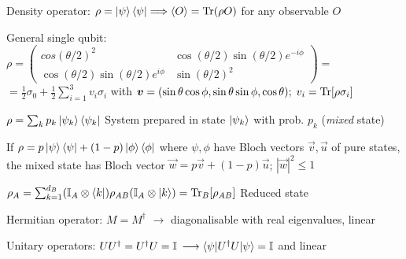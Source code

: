 \begin{squishlist}
    \item Density operator: $\rho = \ket{\psi} \bra{\psi} \Longrightarrow \braket{O} = \mathrm{Tr} (\rho O)$ for any observable $O$
\item General single qubit: $\rho = \begin{pmatrix} cos(\theta/2)^2 & \cos(\theta/2)\sin(\theta/2)e^{-i\phi} \\ \cos(\theta/2)\sin(\theta/2)e^{i\phi} & \sin(\theta/2)^2 \end{pmatrix} = $ \\
$= \frac{1}{2}\sigma_0 + \frac{1}{2}\sum_{i=1}^3 v_i \sigma_i$ with $\mbox{\boldmath$v$} = (\sin\theta \cos\phi , \sin\theta\sin\phi, \cos\theta);\; v_i = \mathrm{Tr}[\rho \sigma_i]$
\item $\rho = \sum_k p_k \ket{\psi_k}\bra{\psi_k}$ System prepared in state $\ket{\psi_k}$ with prob. $p_k$ (\emph{mixed} state)
\item If $\rho = p \ket{\psi}\bra{\psi} + (1-p) \ket{\phi}\bra{\phi}$ where
$\psi, \phi$ have Bloch vectors $\vec{v}, \vec{u}$ of pure states, the mixed state has Bloch vector $\vec{w} = p \vec{v} + (1-p) \vec{u}$; $|\vec{w}|^2 \leq 1$
\item $\rho_A = \sum_{k=1}^{d_B}(\mathbb{I}_A \otimes \bra{k})\rho_{AB}(\mathbb{I}_A \otimes \ket{k}) = \mathrm{Tr}_B[\rho_{AB}]$ \quad Reduced state
\end{squishlist}

\columnbreak

\begin{squishlist}
    \item Hermitian operator: $M = M^{\dagger}$ $\longrightarrow$ diagonalisable with real eigenvalues, linear
    \item Unitary operators: $U U^{\dagger} = U^{\dagger}U = \mathbb{I}$ $\longrightarrow \braket{\psi | U^{\dagger}U|\psi} = \mathbb{I} $ and linear
\end{squishlist}